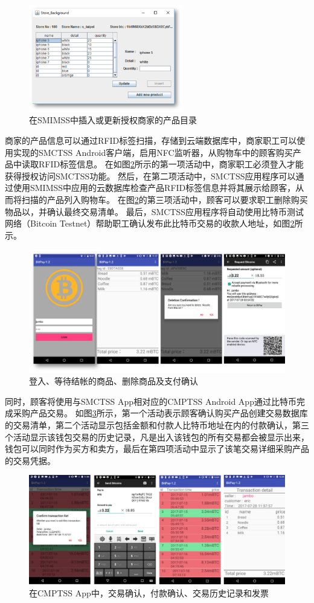 \begin{figure}[!htbp]
	\centering
	\includegraphics[width = 0.6\textwidth]{fig6.png}
	\caption{在SMIMSS中插入或更新授权商家的产品目录}\label{fig6}
\end{figure}

商家的产品信息可以通过RFID标签扫描，存储到云端数据库中，商家职工可以使用实现的SMCTSS Android客户端，启用NFC监听器，从购物车中的顾客购买产品中读取RFID标签信息。 在如图\ref{fig7}所示的第一项活动中，商家职工必须登入才能获得授权访问SMCTSS功能。 然后，在第二项活动中，SMCTSS应用程序可以通过使用SMIMSS中应用的云数据库检查产品RFID标签信息并将其展示给顾客，从而将扫描的产品列入购物车。 在图\ref{fig7}的第三项活动中，顾客可以要求职工删除购买物品以，并确认最终交易清单。 最后，SMCTSS应用程序将自动使用比特币测试网络（Bitcoin Testnet）\supercite{bitcointestnet}帮助职工确认发布此比特币交易的收款人地址，如图\ref{fig7}所示。    

\begin{figure}[!htbp]
	\centering
	\includegraphics[width = 1\textwidth]{fig7.png}
	\caption{登入、等待结帐的商品、删除商品及支付确认}\label{fig7}
\end{figure}

同时，顾客将使用与SMCTSS App相对应的CMPTSS Android App通过比特币完成采购产品交易。 如图\ref{fig8}所示，第一个活动表示顾客确认购买产品创建交易数据库的交易清单，第二个活动显示包括金额和付款人比特币地址在内的付款确认，第三个活动显⽰该钱包交易的历史记录，凡是出入该钱包的所有交易都会被显示出来，
钱包可以同时作为买⽅和卖⽅，最后在第四项活动中显示了该笔交易详细采购产品的交易凭据。    

\begin{figure}[!htbp]
	\centering
	\includegraphics[width = 1\textwidth]{fig8.png}
	\caption{在CMPTSS App中，交易确认，付款确认、交易历史记录和发票}\label{fig8}
\end{figure}